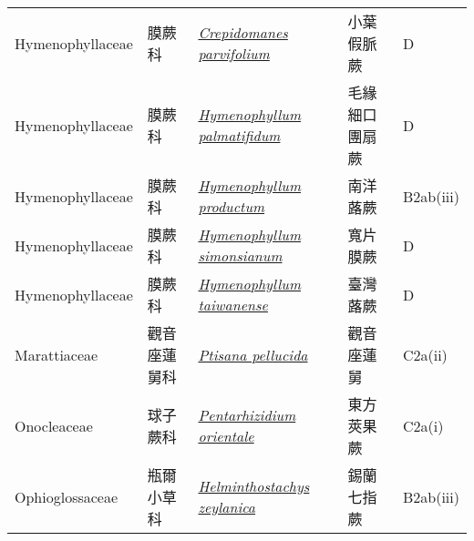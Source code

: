 {\begin{longtable}{L{2.5cm}L{2cm}L{5cm}L{2.5cm}L{3cm}}
    Hymenophyllaceae & 膜蕨科 & \href{http://www.theplantlist.org/tpl1.1/search?q=Crepidomanes+parvifolium}{\textit{Crepidomanes parvifolium} } & 小葉假脈蕨 & D    \\
    Hymenophyllaceae & 膜蕨科 & \href{http://www.theplantlist.org/tpl1.1/search?q=Hymenophyllum+palmatifidum}{\textit{Hymenophyllum palmatifidum} } & 毛緣細口團扇蕨 & D    \\
    Hymenophyllaceae & 膜蕨科 & \href{http://www.theplantlist.org/tpl1.1/search?q=Hymenophyllum+productum}{\textit{Hymenophyllum productum} } & 南洋蕗蕨 & B2ab(iii)    \\
    Hymenophyllaceae & 膜蕨科 & \href{http://www.theplantlist.org/tpl1.1/search?q=Hymenophyllum+simonsianum}{\textit{Hymenophyllum simonsianum} } & 寬片膜蕨 & D    \\
    Hymenophyllaceae & 膜蕨科 & \href{http://www.theplantlist.org/tpl1.1/search?q=Hymenophyllum+taiwanense}{\textit{Hymenophyllum taiwanense} } & 臺灣蕗蕨 & D    \\
    Marattiaceae & 觀音座蓮舅科 & \href{http://www.theplantlist.org/tpl1.1/search?q=Ptisana+pellucida}{\textit{Ptisana pellucida} } & 觀音座蓮舅 & C2a(ii)    \\
    Onocleaceae & 球子蕨科 & \href{http://www.theplantlist.org/tpl1.1/search?q=Pentarhizidium+orientale}{\textit{Pentarhizidium orientale} } & 東方莢果蕨 & C2a(i)    \\
    Ophioglossaceae & 瓶爾小草科 & \href{http://www.theplantlist.org/tpl1.1/search?q=Helminthostachys+zeylanica}{\textit{Helminthostachys zeylanica} } & 錫蘭七指蕨 & B2ab(iii)    \\

\end{longtable}}
